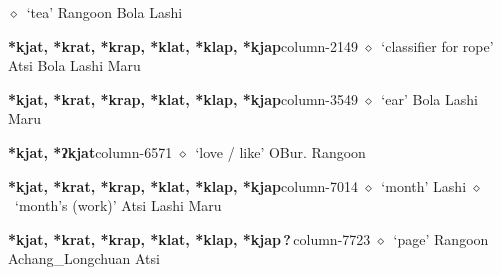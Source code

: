          $\diamond$~`tea'
         Rangoon 
\hspace{1ex}
         Bola 
\hspace{1ex}
         Lashi 
  \item {\footnotesize \textbf{*kjat, *krat, *krap, *klat, *klap, *kjap}}{\tiny column-2149}
         $\diamond$~`classifier for rope'
         Atsi 
\hspace{1ex}
         Bola 
\hspace{1ex}
         Lashi 
\hspace{1ex}
         Maru 
  \item {\footnotesize \textbf{*kjat, *krat, *krap, *klat, *klap, *kjap}}{\tiny column-3549}
         $\diamond$~`ear'
         Bola 
\hspace{1ex}
         Lashi 
\hspace{1ex}
         Maru 
  \item {\footnotesize \textbf{*kjat, *ʔkjat}}{\tiny column-6571}
         $\diamond$~`love / like'
         OBur. 
\hspace{1ex}
         Rangoon 
  \item {\footnotesize \textbf{*kjat, *krat, *krap, *klat, *klap, *kjap}}{\tiny column-7014}
         $\diamond$~`month'
         Lashi 
\hspace{1ex}
         $\diamond$~`month's (work)'
         Atsi 
\hspace{1ex}
         Lashi 
\hspace{1ex}
         Maru 
  \item {\footnotesize \textbf{*kjat, *krat, *krap, *klat, *klap, *kjap\,?\,}}{\tiny column-7723}
         $\diamond$~`page'
         Rangoon 
\hspace{1ex}
         Achang\_Longchuan 
\hspace{1ex}
         Atsi 
\hspace{1ex}
